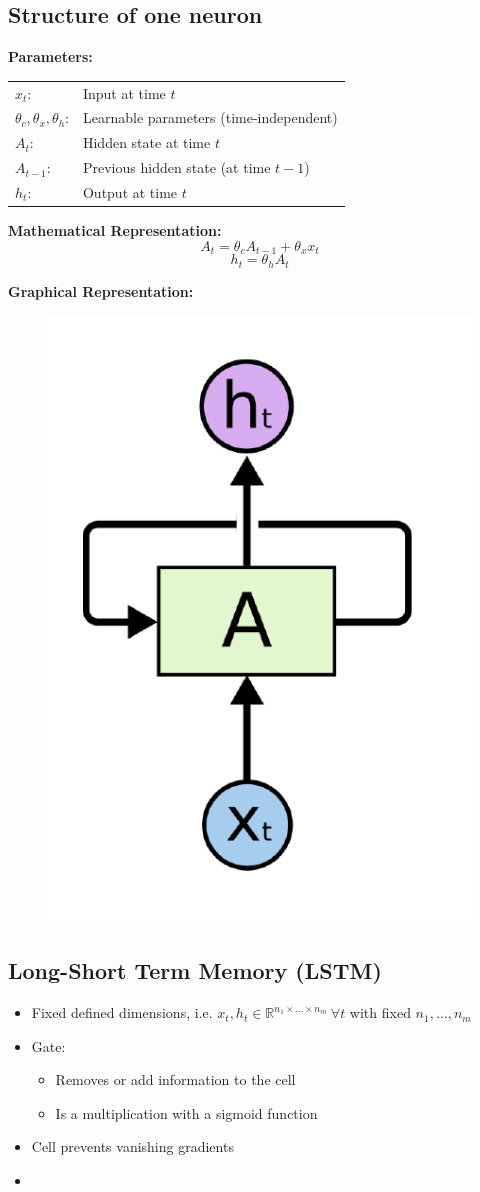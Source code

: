 \documentclass[10pt,a4paper]{article}
\newcommand{\props}{$\circ$}
\newcommand{\iprops}{\item[\props]}
\begin{document}
\subsection{Structure of one neuron}
\textbf{Parameters:} \\
\begin{tabular}{ll}
	$x_t$: & Input at time $t$ \\
	$\theta_c, \theta_x, \theta_h$: & Learnable parameters (time-independent) \\
	$A_t$: & Hidden state at time $t$ \\
	$A_{t-1}$: & Previous hidden state (at time $t-1$) \\
	$h_t$: & Output at time $t$
\end{tabular}

\textbf{Mathematical Representation:}
$$
	A_t = \theta_c A_{t-1} + \theta_x x_t
$$
$$
	h_t = \theta_h A_t
$$

\textbf{Graphical Representation:}
\begin{figure}[H]
	\includegraphics[width=0.3\columnwidth]{figures/rnn_neuron.png}
\end{figure}

\subsection{Long-Short Term Memory (LSTM)}
\begin{itemize}
	\iprops Fixed defined dimensions, i.e. $x_t, h_t \in \mathbb R^{n_1 \times \dots \times n_m}  ~\forall t$ with fixed $n_1, \dots, n_m$
	\iprops Gate:
	\begin{itemize}
		\item Removes or add information to the cell
		\item Is a multiplication with a sigmoid function
	\end{itemize}
	\iprops Cell prevents vanishing gradients
	\iprops
\end{itemize}
\end{document}
